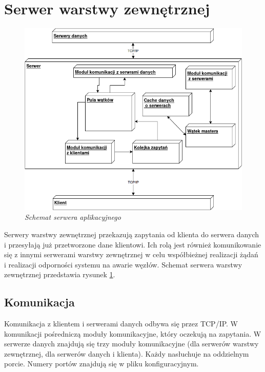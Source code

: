 \section{Serwer warstwy zewnętrznej}

\begin{figure}[!h]
    \begin{center}
    \includegraphics[angle=0,scale=0.5]{img/ext_serv.png}
    \end{center}
    \caption{\em Schemat serwera aplikacyjnego}
    \label{fig:serv}
\end{figure}

Serwery warstwy zewnętrznej przekazują zapytania od klienta do serwera danych i przesyłają już przetworzone dane klientowi. Ich rolą jest również komunikowanie się z innymi serwerami warstwy zewnętrznej w celu współbieżnej realizacji żądań i realizacji odporności systemu na awarie węzłów. Schemat serwera warstwy zewnętrznej przedstawia rysunek \ref{fig:serv}.

\subsection{Komunikacja}
Komunikacja z klientem i serwerami danych odbywa się przez TCP/IP. W komunikacji pośredniczą moduły komunikacyjne, który oczekują na zapytania. W serwerze danych znajdują się trzy moduły komunikacyjne (dla serwerów warstwy zewnętrznej, dla serwerów danych i klienta). Każdy nasłuchuje na oddzielnym porcie. Numery portów znajdują się w pliku konfiguracyjnym. 


